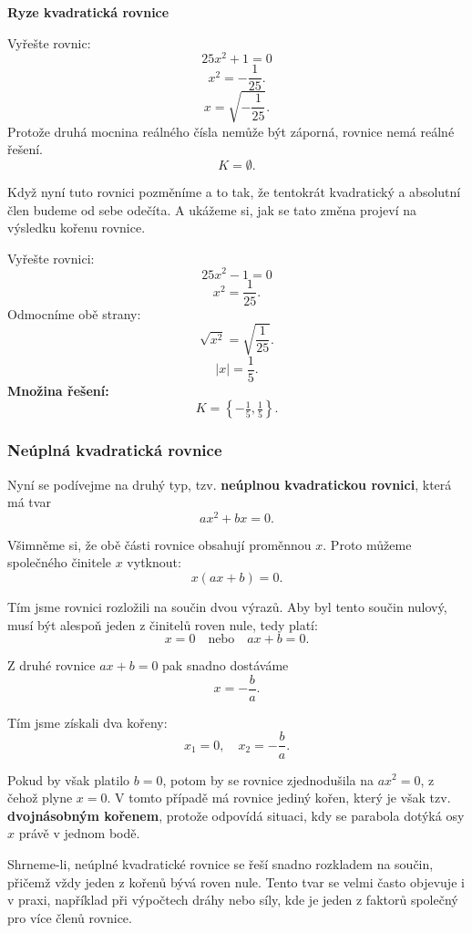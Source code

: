 \documentclass[12pt,a4paper]{article}
\begin{document}
\begin{examplebox}
\textbf{Ryze kvadratická rovnice}

Vyřešte rovnic:
\[
25x^2 + 1 = 0
\]
\[
x^2 = -\frac{1}{25}.
\]
\[
x = \sqrt{-\frac{1}{25}}.
\]
Protože druhá mocnina reálného čísla nemůže být záporná, rovnice nemá reálné řešení.
\[
K = \emptyset.
\]
\end{examplebox}

Když nyní tuto rovnici pozměníme a to tak, že tentokrát kvadratický a absolutní člen budeme od sebe odečíta. A ukážeme si, jak se tato změna projeví na výsledku kořenu rovnice.

\begin{examplebox}
Vyřešte rovnici:
\[
25x^2 - 1 = 0
\] 
\[
x^2 = \frac{1}{25}.
\]
Odmocníme obě strany:
\[
\sqrt{x^2} = \sqrt{\frac{1}{25}}.
\]
\[
|x| = \frac{1}{5}.
\]
\textbf{Množina řešení:}
\[
K = \left\{ -\tfrac{1}{5}, \tfrac{1}{5} \right\}.
\]
\end{examplebox}




\subsubsection*{Neúplná kvadratická rovnice}
Nyní se podívejme na druhý typ, tzv. \textbf{neúplnou kvadratickou rovnici}, 
která má tvar
\[
ax^2 + bx = 0.
\]

Všimněme si, že obě části rovnice obsahují proměnnou \(x\).  
Proto můžeme společného činitele \(x\) vytknout:
\[
x(ax + b) = 0.
\]

Tím jsme rovnici rozložili na součin dvou výrazů.  
Aby byl tento součin nulový, musí být alespoň jeden z činitelů roven nule, 
tedy platí:
\[
x = 0 \quad \text{nebo} \quad ax + b = 0.
\]

Z druhé rovnice \(ax + b = 0\) pak snadno dostáváme
\[
x = -\frac{b}{a}.
\]



Tím jsme získali dva kořeny:
\[
x_1 = 0, \quad x_2 = -\frac{b}{a}.
\]



Pokud by však platilo \(b = 0\), potom by se rovnice zjednodušila na \(ax^2 = 0\), 
z čehož plyne \(x = 0\).  
V tomto případě má rovnice jediný kořen, který je však tzv. 
\textbf{dvojnásobným kořenem}, 
protože odpovídá situaci, kdy se parabola dotýká osy \(x\) právě v jednom bodě.



Shrneme-li, neúplné kvadratické rovnice se řeší snadno rozkladem na součin, 
přičemž vždy jeden z kořenů bývá roven nule. 
Tento tvar se velmi často objevuje i v praxi, například při výpočtech dráhy nebo síly, 
kde je jeden z faktorů společný pro více členů rovnice.
\end{document}
